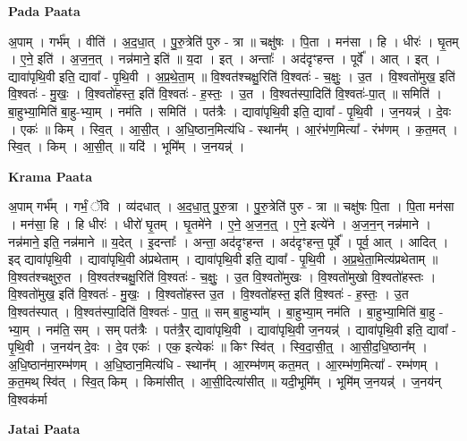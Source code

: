 \documentclass[17pt]{extarticle}
\begin{document}
\textbf{Pada Paata} \newline

अ॒पाम् । गर्भ᳚म् । वीति॑ । अ॒द॒धा॒त् । पु॒रु॒त्रेति॑ पुरु - त्रा ॥ चक्षु॑षः । पि॒ता । मन॑सा । हि । धीरः॑ । घृ॒तम् । ए॒ने॒ इति॑ । अ॒ज॒न॒त् । नन्न॑माने॒ इति॑ ॥ य॒दा । इत् । अन्ताः᳚ । अद॑दृꣳहन्त । पूर्वे᳚ । आत् । इत् । द्यावा॑पृथि॒वी इति॒ द्यावा᳚ - पृ॒थि॒वी । अ॒प्र॒थे॒ता॒म् ॥ वि॒श्वत॑श्चक्षु॒रिति॑ वि॒श्वतः॑ - च॒क्षुः॒ । उ॒त । वि॒श्वतो॑मुख॒ इति॑ वि॒श्वतः॑ - मु॒खः॒ । वि॒श्वतो॑हस्त॒ इति॑ वि॒श्वतः॑ - ह॒स्तः॒ । उ॒त । वि॒श्वत॑स्पा॒दिति॑ वि॒श्वतः॑-पा॒त् ॥ समिति॑ । बा॒हुभ्या॒मिति॑ बा॒हु-भ्या॒म् । नम॑ति । समिति॑ । पत॑त्रैः । द्यावा॑पृथि॒वी इति॒ द्यावा᳚ - पृ॒थि॒वी । ज॒नयन्न्॑ । दे॒वः । एकः॑ ॥ किम् । स्वि॒त् । आ॒सी॒त् । अ॒धि॒ष्ठान॒मित्य॑धि - स्थान᳚म् । आ॒रंभ॑ण॒मित्या᳚ - रंभ॑णम् । क॒त॒मत् । स्वि॒त् । किम् । आ॒सी॒त् ॥ यदि॑ । भूमि᳚म् । ज॒नयन्न्॑ ।  \newline


\textbf{Krama Paata} \newline

अ॒पाम् गर्भ᳚म् । गर्भं॒ ॅवि । व्य॑दधात् । अ॒द॒धा॒त्॒ पु॒रु॒त्रा । पु॒रु॒त्रेति॑ पुरु - त्रा ॥ चक्षु॑षः पि॒ता । पि॒ता मन॑सा । मन॑सा॒ हि । हि धीरः॑ । धीरो॑ घृ॒तम् । घृ॒तमे॑ने । ए॒ने॒ अ॒ज॒न॒त्॒ । ए॒ने॒ इत्ये॑ने । अ॒ज॒न॒न् नन्न॑माने । नन्न॑माने॒ इति॒ नन्न॑माने ॥ य॒देत् । इ॒दन्ताः᳚ । अन्ता॒ अद॑दृꣳहन्त । अद॑दृꣳहन्त॒ पूर्वे᳚ । पूर्व॒ आत् । आदित् । इद् द्यावा॑पृथि॒वी । द्यावा॑पृथि॒वी अ॑प्रथेताम् । द्यावा॑पृथि॒वी इति॒ द्यावा᳚ - पृ॒थि॒वी । अ॒प्र॒थे॒ता॒मित्य॑प्रथेताम् ॥ वि॒श्वत॑श्चक्षुरु॒त । वि॒श्वत॑श्चक्षु॒रिति॑ वि॒श्वतः॑ - च॒क्षुः॒ । उ॒त वि॒श्वतो॑मुखः । वि॒श्वतो॑मुखो वि॒श्वतो॑हस्तः । वि॒श्वतो॑मुख॒ इति॑ वि॒श्वतः॑ - मु॒खः॒ । वि॒श्वतो॑हस्त उ॒त । वि॒श्वतो॑हस्त॒ इति॑ वि॒श्वतः॑ - ह॒स्तः॒ । उ॒त वि॒श्वत॑स्पात् । वि॒श्वत॑स्पा॒दिति॑ वि॒श्वतः॑ - पा॒त्॒ ॥ सम् बा॒हुभ्या᳚म् । बा॒हुभ्या॒म् नम॑ति । बा॒हुभ्या॒मिति॑ बा॒हु - भ्या॒म् । नम॑ति॒ सम् । सम् पत॑त्रैः । पत॑त्रै॒र् द्यावा॑पृथि॒वी । द्यावा॑पृथि॒वी ज॒नयन्न्॑ । द्यावा॑पृथि॒वी इति॒ द्यावा᳚ - पृ॒थि॒वी । ज॒नय॑न् दे॒वः । दे॒व एकः॑ । एक॒ इत्येकः॑ ॥ किꣳ स्वि॑त् । स्वि॒दा॒सी॒त्॒ । आ॒सी॒द॒धि॒ष्ठान᳚म् । अ॒धि॒ष्ठान॑मा॒रम्भ॑णम् । अ॒धि॒ष्ठान॒मित्य॑धि - स्थान᳚म् । आ॒रम्भ॑णम् कत॒मत् । आ॒रम्भ॑ण॒मित्या᳚ - रम्भ॑णम् । क॒त॒मथ् स्वि॑त् । स्वि॒त् किम् । किमा॑सीत् । आ॒सी॒दित्या॑सीत् ॥ यदी॒भूमि᳚म् । भूमि॑म् ज॒नयन्न्॑ । ज॒नय॑न् वि॒श्वक॑र्मा \newline

\textbf{Jatai Paata} \newline
\end{document}
